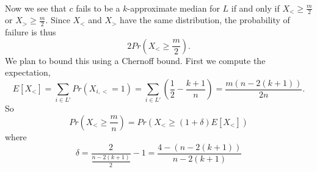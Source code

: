 \documentclass[letterpaper,12pt,oneside,onecolumn]{article}
\begin{document}
\paragraph{}
Now we see that $c$ fails to be a $k$-approximate median for $L$ if and only if $X_< \geq \frac{m}{2}$ or $X_> \geq \frac{m}{2}$. Since $X_<$ and $X_>$ have the same distribution, the probability of failure is thus
$$2Pr(X_< \geq \frac{m}{2}).$$
We plan to bound this using a Chernoff bound. First we compute the expectation,
$$E[X_<] = \sum_{i\in L'} Pr(X_{i,<} = 1)  = \sum_{i \in L'} (\frac{1}{2} - \frac{k+1}{n}) = \frac{m(n-2(k+1))}{2n}.$$
So 
$$Pr(X_< \geq \frac{m}{n}) = Pr(X_< \geq (1+\delta) E[X_<])$$
where $$\delta = \frac{2}{\frac{n-2(k+1)}{2}}-1=\frac{4-(n-2(k+1))}{n-2(k+1)}$$
\newpage
\section{}

\newpage
\section{}
\end{document}
